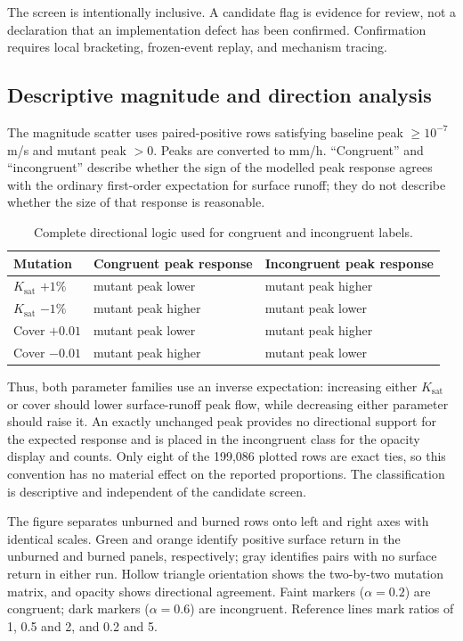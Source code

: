 \documentclass[11pt]{article}
\newcommand{\Ksat}{\ensuremath{K_{\mathrm{sat}}}}
\begin{document}
The screen is intentionally inclusive. A candidate flag is evidence for
review, not a declaration that an implementation defect has been confirmed.
Confirmation requires local bracketing, frozen-event replay, and mechanism
tracing.

\subsection{Descriptive magnitude and direction analysis}

The magnitude scatter uses paired-positive rows satisfying baseline peak
$\geq 10^{-7}$ m/s and mutant peak $>0$. Peaks are converted to mm/h.
``Congruent'' and ``incongruent'' describe whether the sign of the modelled peak
response agrees with the ordinary first-order expectation for surface runoff;
they do not describe whether the size of that response is reasonable.

\begin{table}[H]
  \centering
  \caption{Complete directional logic used for congruent and incongruent
  labels.}
  \label{tab:congruence-logic}
  \begin{tabular}{lll}
    \toprule
    Mutation & Congruent peak response & Incongruent peak response \\
    \midrule
    \Ksat{} $+1\%$ & mutant peak lower & mutant peak higher \\
    \Ksat{} $-1\%$ & mutant peak higher & mutant peak lower \\
    Cover $+0.01$ & mutant peak lower & mutant peak higher \\
    Cover $-0.01$ & mutant peak higher & mutant peak lower \\
    \bottomrule
  \end{tabular}
\end{table}

Thus, both parameter families use an inverse expectation: increasing either
\Ksat{} or cover should lower surface-runoff peak flow, while decreasing either
parameter should raise it. An exactly unchanged peak provides no directional
support for the expected response and is placed in the incongruent class for
the opacity display and counts. Only eight of the 199,086 plotted rows are exact
ties, so this convention has no material effect on the reported proportions.
The classification is descriptive and independent of the candidate screen.

The figure separates unburned and burned rows onto left and right axes with
identical scales. Green and orange identify positive surface return in the
unburned and burned panels, respectively; gray identifies pairs with no
surface return in either run. Hollow triangle orientation shows the two-by-two
mutation matrix, and opacity shows directional agreement. Faint
markers ($\alpha=0.2$) are congruent; dark markers ($\alpha=0.6$) are
incongruent. Reference lines mark ratios of 1, 0.5 and 2, and 0.2 and 5.
\end{document}
